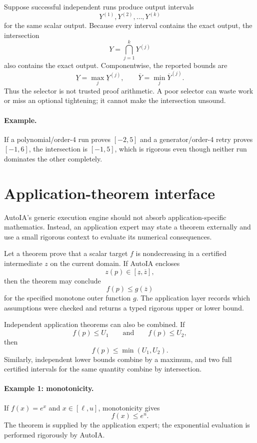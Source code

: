 \documentclass[11pt]{article}
\begin{document}
Suppose successful independent runs produce output intervals
\[
  Y^{(1)},Y^{(2)},\ldots,Y^{(k)}
\]
for the same scalar output.  Because every interval contains the exact output,
the intersection
\[
  \boxed{Y=\bigcap_{j=1}^kY^{(j)}}
\]
also contains the exact output.  Componentwise, the reported bounds are
\[
  \underline Y=\max_j\underline Y^{(j)},
  \qquad
  \overline Y=\min_j\overline Y^{(j)}.
\]
Thus the selector is not trusted proof arithmetic.  A poor selector can waste
work or miss an optional tightening; it cannot make the intersection unsound.

\paragraph{Example.}
If a polynomial/order-4 run proves \([-2,5]\) and a generator/order-4 retry proves
\([-1,6]\), the intersection is \([-1,5]\), which is rigorous even though
neither run dominates the other completely.

\section{Application-theorem interface}

AutoIA's generic execution engine should not absorb application-specific
mathematics.  Instead, an application expert may state a theorem externally and
use a small rigorous context to evaluate its numerical consequences.

Let a theorem prove that a scalar target \(f\) is nondecreasing in a certified
intermediate \(z\) on the current domain.  If AutoIA encloses
\[
  z(p)\in[\underline z,\overline z],
\]
then the theorem may conclude
\[
  f(p)\le g(\overline z)
\]
for the specified monotone outer function \(g\).  The application layer records
which assumptions were checked and returns a typed rigorous upper or lower bound.

Independent application theorems can also be combined.  If
\[
  f(p)\le U_1
  \qquad\text{and}\qquad
  f(p)\le U_2,
\]
then
\[
  f(p)\le \min(U_1,U_2).
\]
Similarly, independent lower bounds combine by a maximum, and two full certified
intervals for the same quantity combine by intersection.

\paragraph{Example 1: monotonicity.}
If \(f(x)=e^x\) and \(x\in[\ell,u]\), monotonicity gives
\[
  f(x)\le e^u.
\]
The theorem is supplied by the application expert; the exponential evaluation is
performed rigorously by AutoIA.
\end{document}
